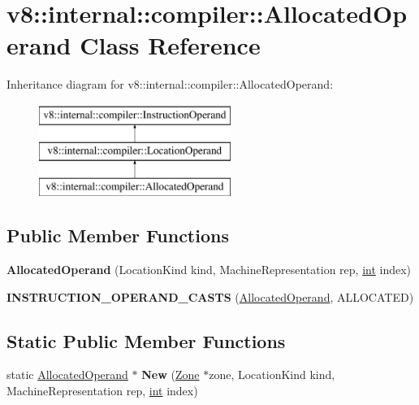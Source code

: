 \hypertarget{classv8_1_1internal_1_1compiler_1_1AllocatedOperand}{}\section{v8\+:\+:internal\+:\+:compiler\+:\+:Allocated\+Operand Class Reference}
\label{classv8_1_1internal_1_1compiler_1_1AllocatedOperand}
Inheritance diagram for v8\+:\+:internal\+:\+:compiler\+:\+:Allocated\+Operand\+:\begin{figure}[H]
\begin{center}
\leavevmode
\includegraphics[height=3.000000cm]{classv8_1_1internal_1_1compiler_1_1AllocatedOperand}
\end{center}
\end{figure}
\subsection*{Public Member Functions}
\begin{DoxyCompactItemize}
\item 
\mbox{\label{classv8_1_1internal_1_1compiler_1_1AllocatedOperand_a1e23e5746e40802c4376243abdbe8e48}} 
{\bfseries Allocated\+Operand} (Location\+Kind kind, Machine\+Representation rep, \mbox{\hyperlink{classint}{int}} index)
\item 
\mbox{\label{classv8_1_1internal_1_1compiler_1_1AllocatedOperand_a7dc1520248d33f029a009fdc7d5951a1}} 
{\bfseries I\+N\+S\+T\+R\+U\+C\+T\+I\+O\+N\+\_\+\+O\+P\+E\+R\+A\+N\+D\+\_\+\+C\+A\+S\+TS} (\mbox{\hyperlink{classv8_1_1internal_1_1compiler_1_1AllocatedOperand}{Allocated\+Operand}}, A\+L\+L\+O\+C\+A\+T\+ED)
\end{DoxyCompactItemize}
\subsection*{Static Public Member Functions}
\begin{DoxyCompactItemize}
\item 
\mbox{\label{classv8_1_1internal_1_1compiler_1_1AllocatedOperand_a5981dcc601391236e463e4afaee84bbe}} 
static \mbox{\hyperlink{classv8_1_1internal_1_1compiler_1_1AllocatedOperand}{Allocated\+Operand}} $\ast$ {\bfseries New} (\mbox{\hyperlink{classv8_1_1internal_1_1Zone}{Zone}} $\ast$zone, Location\+Kind kind, Machine\+Representation rep, \mbox{\hyperlink{classint}{int}} index)
\end{DoxyCompactItemize}
